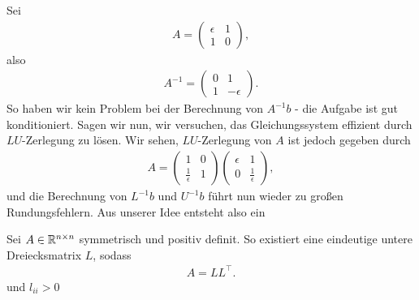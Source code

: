 \documentclass{report}
\begin{document}
\begin{example}
	Sei 
	\begin{align*}
		A = \begin{pmatrix}
			\epsilon & 1\\ 
			1 & 0
		\end{pmatrix},
	\end{align*}
	also
	\begin{align*}
		A^{-1} = \begin{pmatrix}
			0 & 1\\ 
			1 & -\epsilon
		\end{pmatrix}.
	\end{align*}
	So haben wir kein Problem bei der Berechnung von $A^{-1}b$ - die Aufgabe ist gut konditioniert. Sagen wir nun, wir versuchen, das Gleichungssystem effizient durch $LU$-Zerlegung zu lösen. Wir sehen, $LU$-Zerlegung von $A$ ist jedoch gegeben durch
	\begin{align*}
		A = 
		\begin{pmatrix}
			1 & 0\\ 
			\frac{1}{\epsilon} & 1
		\end{pmatrix}
		\begin{pmatrix}
			\epsilon & 1\\ 
			0 & \frac{1}{\epsilon}
		\end{pmatrix},
	\end{align*}
	und die Berechnung von $L^{-1}b$ und  $U^{-1}b$ führt nun wieder zu großen Rundungsfehlern. Aus unserer Idee entsteht also ein 
\end{example}
\begin{theorem}
	 Sei $A \in \mathbb{R}^{n \times n}$ symmetrisch und positiv definit. So existiert eine eindeutige untere Dreiecksmatrix $L$, sodass
	\begin{align*}
		A = LL^\top.
	\end{align*} 
	und $l_{ii} > 0$
\end{theorem}
\end{document}
